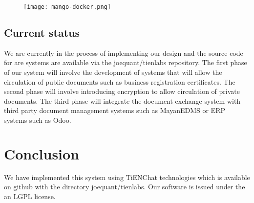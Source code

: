 \documentclass[journal]{IEEEtran}
\begin{document}
\begin{comment}
@startuml

package "Some Group" {
  HTTP - [First Component]
  [Another Component]
}
 
node "Other Groups" {
  FTP - [Second Component]
  [First Component] --> FTP
} 

cloud {
  [Example 1]
}


database "MySql" {
  folder "This is my folder" {
	[Folder 3]
  }
  frame "Foo" {
	[Frame 4]
  }
}


[Another Component] --> [Example 1]
[Example 1] --> [Folder 3]
[Folder 3] --> [Frame 4]

@enduml
\end{comment}
\begin{figure}
  \texttt{[image: mango-docker.png]}
\end{figure}
\begin{comment}
@startuml

package "Another Group" {
  HTTP - [First Component]
  [Another Component]
}
 
node "Other Groups" {
  FTP - [Second Component]
  [First Component] --> FTP
} 

cloud {
  [Example 1]
}


database "MySql" {
  folder "This is my folder" {
	[Folder 3]
  }
  frame "Foo" {
	[Frame 4]
  }
}


[Another Component] --> [Example 1]
[Example 1] --> [Folder 3]
[Folder 3] --> [Frame 4]

@enduml
\end{comment}

\subsection{Current status}

We are currently in the process of implementing our design and the
source code for are systems are available via the joequant/tienlabs
repository.  The first phase of our system will involve the
development of systems that will allow the circulation of public
documents such as business registration certificates.  The second
phase will involve introducing encryption to allow circulation of
private documents.  The third phase will integrate the document
exchange system with third party document management systems such as
MayanEDMS or ERP systems such as Odoo.

\section{Conclusion}
We have implemented this system using TiENChat technologies which is
available on github with the directory joequant/tienlabs.  Our
software is issued under the an LGPL license.
\end{document}
